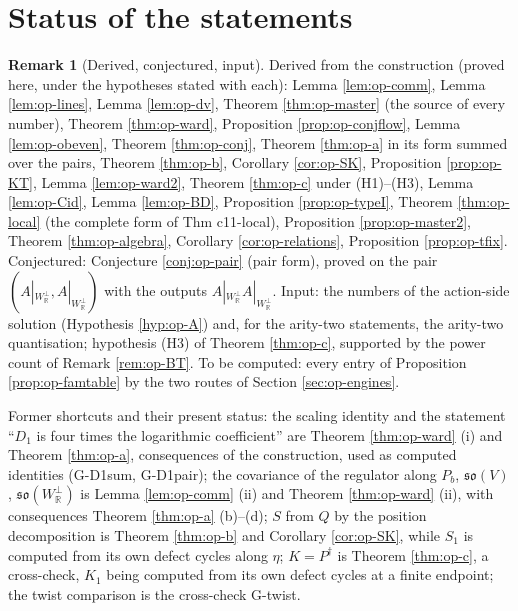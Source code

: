 \documentclass[11pt]{article}
\numberwithin{equation}{section}
\theoremstyle{plain}
\theoremstyle{definition}
\newtheorem{remark}[theorem]{Remark}
\newcommand{\Ap}{A|_{W_{\mathbb R}^\perp}}
\begin{document}
\section{Status of the statements}
\label{sec:op-status}

\begin{remark}[Derived, conjectured, input]
\label{rem:op-status}
Derived from the construction (proved here, under the hypotheses stated with each): Lemma \ref{lem:op-comm}, Lemma \ref{lem:op-lines}, Lemma \ref{lem:op-dv}, Theorem \ref{thm:op-master} (the source of every number), Theorem \ref{thm:op-ward}, Proposition \ref{prop:op-conjflow}, Lemma \ref{lem:op-obeven}, Theorem \ref{thm:op-conj}, Theorem \ref{thm:op-a} in its form summed over the pairs, Theorem \ref{thm:op-b}, Corollary \ref{cor:op-SK}, Proposition \ref{prop:op-KT}, Lemma \ref{lem:op-ward2}, Theorem \ref{thm:op-c} under (H1)--(H3), Lemma \ref{lem:op-Cid}, Lemma \ref{lem:op-BD}, Proposition \ref{prop:op-typeI}, Theorem \ref{thm:op-local} (the complete form of Thm c11-local), Proposition \ref{prop:op-master2}, Theorem \ref{thm:op-algebra}, Corollary \ref{cor:op-relations}, Proposition \ref{prop:op-tfix}. Conjectured: Conjecture \ref{conj:op-pair} (pair form), proved on the pair $(\Ap,\Ap)$ with the outputs $\Ap\Ap$. Input: the numbers of the action-side solution (Hypothesis \ref{hyp:op-A}) and, for the arity-two statements, the arity-two quantisation; hypothesis (H3) of Theorem \ref{thm:op-c}, supported by the power count of Remark \ref{rem:op-BT}. To be computed: every entry of Proposition \ref{prop:op-famtable} by the two routes of Section \ref{sec:op-engines}.

Former shortcuts and their present status: the scaling identity and the statement ``$D_1$ is four times the logarithmic coefficient'' are Theorem \ref{thm:op-ward} (i) and Theorem \ref{thm:op-a}, consequences of the construction, used as computed identities (G-D1sum, G-D1pair); the covariance of the regulator along $P_b$, $\mathfrak{so}(V)$, $\mathfrak{so}(W_{\mathbb R}^\perp)$ is Lemma \ref{lem:op-comm} (ii) and Theorem \ref{thm:op-ward} (ii), with consequences Theorem \ref{thm:op-a} (b)--(d); $S$ from $Q$ by the position decomposition is Theorem \ref{thm:op-b} and Corollary \ref{cor:op-SK}, while $S_1$ is computed from its own defect cycles along $\eta$; $K=P^\dagger$ is Theorem \ref{thm:op-c}, a cross-check, $K_1$ being computed from its own defect cycles at a finite endpoint; the twist comparison is the cross-check G-twist.
\end{remark}
\end{document}
